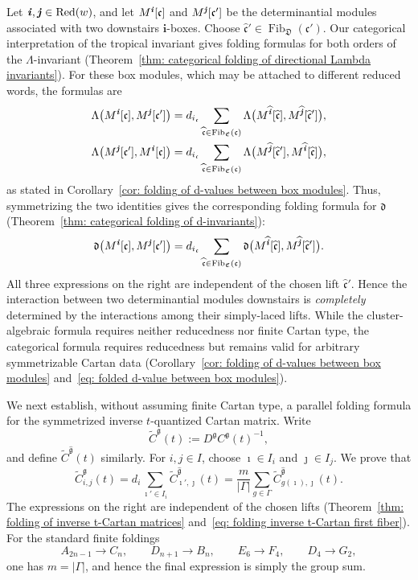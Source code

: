 \documentclass[12pt, leqno]{amsart}
\numberwithin{equation}{section}
\theoremstyle{plain}
\theoremstyle{definition}
\newcommand{\seteq}{\mathbin{:=}}
\newcommand{\g}{\mathfrak{g}}
\newcommand{\de}{\mathfrak{d}}
\newcommand{\im}{\imath}
\newcommand{\jm}{\jmath}
\newcommand{\ii}{ \textbf{\textit{i}}}
\newcommand{\jj}{ \textbf{\textit{j}}}
\newcommand{\Fib}{\operatorname{Fib}}
\newcommand{\tC}{\widetilde{C}}
\newcommand{\hg}{{\widehat{\g}}}
\newcommand{\hii}{{\widehat{\ii}}}
\newcommand{\hjj}{{\widehat{\jj}}}
\newcommand{\frakC}{\mathfrak{C}}
\newcommand{\frakD}{\mathfrak{D}}
\newcommand{\frakc}{\mathfrak{c}}
\newcommand{\hfrakc}{\widehat{\frakc}}
\newcommand{\bfi}{\mathbf{i}}
\newcommand{\Red}{\mathrm{Red}}
\begin{document}
Let \(\ii,\jj\in\Red(w)\), and let \(M^\ii[\frakc]\) and
\(M^\jj[\frakc']\) be the determinantial modules associated with
two downstairs \(\bfi\)-boxes.  Choose
\(\hfrakc'\in\Fib_{\frakD}(\frakc')\).
Our categorical interpretation of the tropical invariant gives
folding formulas for both orders of the \(\Lambda\)-invariant
(Theorem~\ref{thm: categorical folding of directional Lambda invariants}).
For these box modules, which may be attached to different reduced
words, the formulas are
\[
\begin{aligned}
\Lambda\bigl(M^\ii[\frakc],M^\jj[\frakc']\bigr)
&=d_{i_\frakc}\sum_{\hfrakc\in\Fib_{\frakC}(\frakc)}
\Lambda\bigl(M^\hii[\hfrakc],M^\hjj[\hfrakc']\bigr),\\
\Lambda\bigl(M^\jj[\frakc'],M^\ii[\frakc]\bigr)
&=d_{i_\frakc}\sum_{\hfrakc\in\Fib_{\frakC}(\frakc)}
\Lambda\bigl(M^\hjj[\hfrakc'],M^\hii[\hfrakc]\bigr),
\end{aligned}
\]
as stated in Corollary~\ref{cor: folding of d-values between box modules}.
Thus, symmetrizing the two identities gives the corresponding folding formula for
\(\de\)
(Theorem~\ref{thm: categorical folding of d-invariants}):
\[
\de\bigl(M^\ii[\frakc],M^\jj[\frakc']\bigr)= 
d_{i_\frakc} \sum_{\hfrakc\in\Fib_{\frakC}(\frakc)}
\de\bigl(M^\hii[\hfrakc],M^\hjj[\hfrakc']\bigr).
\]
All three expressions on the right are independent of the
chosen lift \(\hfrakc'\). Hence the
interaction between two determinantial modules downstairs is
\emph{completely} determined by the interactions among their simply-laced
lifts.  While the cluster-algebraic formula requires neither reducedness nor
finite Cartan type, the categorical formula requires reducedness but remains
valid for arbitrary symmetrizable Cartan data 
(Corollary~\ref{cor: folding of d-values between box modules} and~\eqref{eq: folded d-value between box modules}).

\smallskip

We next establish, without assuming finite Cartan type, a parallel
folding formula for the symmetrized inverse \(t\)-quantized Cartan
matrix.  Write
\[
\tC^\g(t)\seteq D^\g C^\g(t)^{-1},
\]
and define \(\tC^\hg(t)\) similarly.  For \(i,j\in I\), choose
\(\im\in I_i\) and \(\jm\in I_j\).  We prove that
\[
\tC_{i,j}^{\g}(t)
=
d_i\sum_{\im'\in I_i} \tC_{\im',\jm}^{\hg}(t)
= \frac{m}{|\Gamma|} \sum_{g\in \Gamma} \tC_{g(\im),\jm}^{\hg}(t).
\]
The expressions on the right are independent of the chosen lifts
(Theorem~\ref{thm: folding of inverse t-Cartan matrices} and~\eqref{eq: folding inverse t-Cartan first fiber}).
For the standard finite foldings
\[
A_{2n-1}\longrightarrow C_n,\qquad
D_{n+1}\longrightarrow B_n,\qquad
E_6\longrightarrow F_4,\qquad
D_4\longrightarrow G_2,
\]
one has \(m=|\Gamma|\), and hence the final expression is simply the
group sum.
\end{document}
